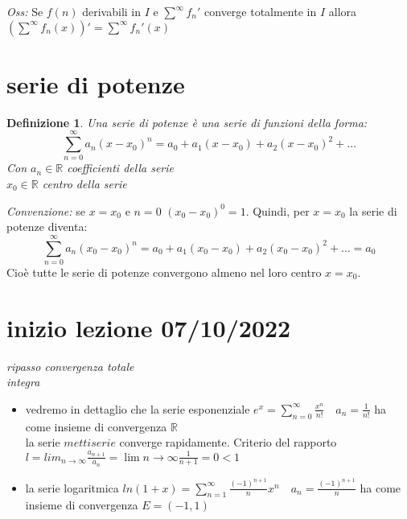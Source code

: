 \documentclass{scrreprt}
\newtheorem{defn}{Definizione}
\newenvironment{definition}{\begin{mdframed}[backgroundcolor=Ivory2]\begin{defn}}{\end{defn}\end{mdframed}}
\begin{document}
\emph{Oss:} Se $f(n)$ derivabili in $I$ e $\sum^\infty f_n'$ converge totalmente in $I$ allora $\left(\sum^\infty f_n(x)\right)' = \sum^\infty f_n'(x)$





\section{serie di potenze}
\begin{definition}
	Una serie di potenze è una serie di funzioni della forma:
	\begin{equation}
		\sum_{n=0}^\infty a_n \left(x-x_0\right)^n = a_0+a_1(x-x_0)+a_2(x-x_0)^2+\dots 
	\end{equation}
	Con $a_n \in \mathbb{R}$ coefficienti della serie\\
	$x_0 \in \mathbb{R}$ centro della serie
\end{definition}
\emph{Convenzione:} se $x=x_0$ e $n=0$ $\left(x_0-x_0\right)^0 = 1$. Quindi, per $x=x_0$ la serie di potenze diventa:
\begin{equation}
	\sum_{n=0}^\infty a_n \left(x_0-x_0\right)^n = a_0+a_1(x_0-x_0)+a_2(x_0-x_0)^2+\dots = a_0
\end{equation}
Cioè tutte le serie di potenze convergono almeno nel loro centro $x=x_0$.\\

\section*{inizio lezione 07/10/2022}
\emph{ripasso convergenza totale}\\
\emph{integra}
\begin{itemize}
	

	\item vedremo in dettaglio che la serie esponenziale $e^x=\sum_{n=0}^\infty \frac{x^n}{n!} \quad a_n = \frac{1}{n!}$ ha come insieme di convergenza $\mathbb{R}$\\
			la serie $metti serie$ converge rapidamente. Criterio del rapporto $l=lim_{n\to\infty} \frac{a_{n+1}}{a_n} = \lim{n\to\infty}\frac{1}{n+1}=0<1$\\
	\item la serie logaritmica $ln(1+x)=\sum_{n=1}^\infty \frac{(-1)^{n+1}}{n}x^n \quad a_n = \frac{(-1)^{n+1}}{n}$ ha come insieme di convergenza $E=(-1,1)$\\
\end{itemize}
\end{document}
